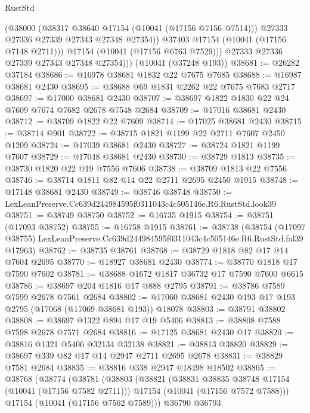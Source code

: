 \begin{lexlean}{RustStd}
\begin{coremodule}
                (@38000
                  (@38317 @38640 @17154 (@10041 (@17156 @7156 @7514)))
                  @27333
                  @27336
                  @27339
                  @27343
                  @27348
                  @27354))
              @37403
              @17154
              (@10041 (@17156 @7148 @2711)))
            @17154
            (@10041 (@17156 @6763 @7529)))
          @27333
          @27336
          @27339
          @27343
          @27348
          @27354)))
    (@10041 (@37248 @193))
@38681 := @26282 @37184
@38686 := @16978 @38681 @1832 @22 @7675 @7685
@38688 := @16987 @38681 @2430
@38695 := @38688 @69 @1831 @2262 @22 @7675 @7683 @2717
@38697 := @17000 @38681 @2430
@38707 := @38697 @1822 @1830 @22 @24 @7609 @7674 @7682 @2678 @7548 @2684
@38709 := @17016 @38681 @2430
@38712 := @38709 @1822 @22 @7609
@38714 := @17025 @38681 @2430
@38715 := @38714 @901
@38722 := @38715 @1821 @1199 @22 @2711 @7607 @2450 @1209
@38724 := @17039 @38681 @2430
@38727 := @38724 @1821 @1199 @7607
@38729 := @17048 @38681 @2430
@38730 := @38729 @1813
@38735 := @38730 @1820 @22 @19 @7556 @7606
@38738 := @38709 @1813 @22 @7556
@38746 := @38714 @1811 @82 @14 @22 @2711 @2695 @2450 @1915
@38748 := @17148 @38681 @2430
@38749 := @38746 @38748
@38750 := LexLeanPreserve.Cc639d244984595f0311043c4c505146e.R6.RustStd.look39
@38751 := @38749 @38750
@38752 := @16735 @1915
@38754 := @38751 (@17093 @38752)
@38755 := @16758 @1915
@38761 := @38738
    (@38754
      (@17097 @38755)
      LexLeanPreserve.Cc639d244984595f0311043c4c505146e.R6.RustStd.fal39
      @17963)
@38762 := @38735 @38761
@38768 := @38729 @1818 @82 @17 @14 @7604 @2695
@38770 := @18927 @38681 @2430
@38774 := @38770 @1818 @17 @7590 @7602
@38781 := @38688 @1672 @1817 @36732 @17 @7590 @7600 @6615
@38786 := @38697 @204 @1816 @17 @888 @2795
@38791 := @38786 @7589 @7599 @2678 @7561 @2684
@38802 := @17060 @38681 @2430 @193 @17 @193 @2795 (@17068 (@17069 @38681 @193)) @18078
@38803 := @38791 @38802
@38808 := @38697 @1322 @894 @17 @19 @5406
@38813 := @38808 @7588 @7598 @2678 @7571 @2684
@38816 := @17125 @38681 @2430 @17
@38820 := @38816 @1321 @5406 @32134 @32138
@38821 := @38813 @38820
@38829 := @38697 @339 @82 @17 @14 @2947 @2711 @2695 @2678
@38831 := @38829 @7581 @2684
@38835 := @38816 @338 @2947 @18498 @18502
@38865 := @38768
    (@38774
      (@38781
        (@38803
          (@38821
            (@38831 @38835 @38748 @17154 (@10041 (@17156 @7582 @2711)))
            @17154
            (@10041 (@17156 @7572 @7588)))
          @17154
          (@10041 (@17156 @7562 @7589)))
        @36790
        @36793

\end{coremodule}
\end{lexlean}
